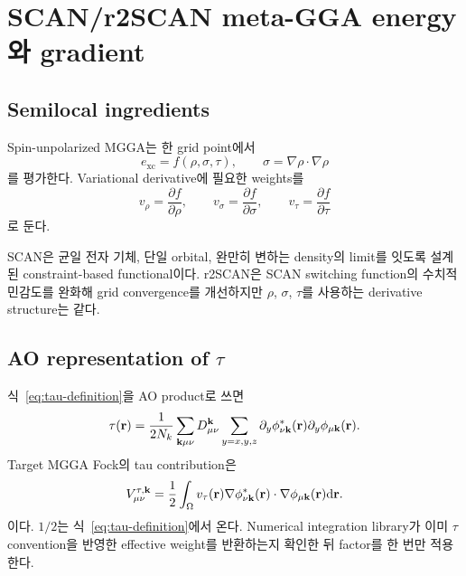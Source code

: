 \section{SCAN/r2SCAN meta-GGA energy와 gradient}
\label{sec:mgga}

\subsection{Semilocal ingredients}

Spin-unpolarized MGGA는 한 grid point에서
\begin{equation}
  e_{\mathrm{xc}}
  =f(\rho,\sigma,\tau),
  \qquad \sigma=\nabla\rho\cdot\nabla\rho
  \label{eq:mgga-ingredients}
\end{equation}
를 평가한다. Variational derivative에 필요한 weights를
\begin{equation}
  v_\rho=\frac{\partial f}{\partial\rho},
  \qquad
  v_\sigma=\frac{\partial f}{\partial\sigma},
  \qquad
  v_\tau=\frac{\partial f}{\partial\tau}
  \label{eq:mgga-weights}
\end{equation}
로 둔다.

SCAN은 균일 전자 기체, 단일 orbital, 완만히 변하는 density의 limit를 잇도록 설계된
constraint-based functional이다. r2SCAN은 SCAN switching function의 수치적 민감도를
완화해 grid convergence를 개선하지만 $\rho$, $\sigma$, $\tau$를 사용하는 derivative
structure는 같다.

\subsection{AO representation of \texorpdfstring{$\tau$}{tau}}

식~\eqref{eq:tau-definition}을 AO product로 쓰면
\begin{equation}
  \tau(\mathbf r)
  =\frac{1}{2N_k}\sum_{\mathbf{k}\mu\nu}D_{\mu\nu}^{\mathbf{k}}
   \sum_{y=x,y,z}
   \partial_y\phi_{\nu\mathbf{k}}^{*}(\mathbf r)
   \partial_y\phi_{\mu\mathbf{k}}(\mathbf r).
  \label{eq:mgga-tau-ao}
\end{equation}
Target MGGA Fock의 tau contribution은
\begin{equation}
  V_{\mu\nu}^{\tau,\mathbf{k}}
  =\frac12\int_\Omega v_\tau(\mathbf r)
   \nabla\phi_{\nu\mathbf{k}}^{*}(\mathbf r)\cdot
   \nabla\phi_{\mu\mathbf{k}}(\mathbf r)\mathrm{d}\mathbf r.
  \label{eq:mgga-vtau-matrix}
\end{equation}
이다. $1/2$는 식~\eqref{eq:tau-definition}에서 온다. Numerical integration library가
이미 $\tau$ convention을 반영한 effective weight를 반환하는지 확인한 뒤 factor를 한
번만 적용한다.

